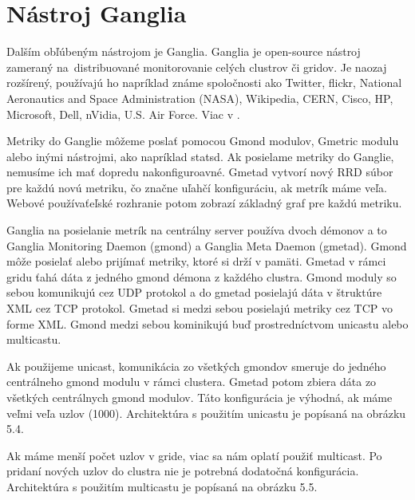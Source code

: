\documentclass[a4paper, upjsfrontpage, disablespecwarning, thesismargins, thesislinespacing]{rnthesis}
\begin{document}

\section{Nástroj Ganglia}

Dalším obľúbeným nástrojom je Ganglia.
Ganglia je open-source nástroj zameraný na~distribuované monitorovanie celých clustrov či gridov.
Je naozaj rozšírený, používajú ho napríklad známe spoločnosti ako Twitter, flickr, National Aeronautics and Space Administration (NASA), Wikipedia, CERN, Cisco, HP, Microsoft, Dell, nVidia, U.S. Air Force.
Viac v \cite{5}.

Metriky do Ganglie môžeme poslať pomocou Gmond modulov, Gmetric modulu alebo inými nástrojmi, ako napríklad statsd.
Ak posielame metriky do Ganglie, nemusíme ich mať dopredu nakonfiguroavné.
Gmetad vytvorí nový RRD súbor pre každú novú metriku, čo značne uľahčí konfiguráciu, ak metrík máme veľa.
Webové používaťeľské rozhranie potom zobrazí základný graf pre každú metriku.

Ganglia na posielanie metrík na centrálny server používa dvoch démonov a to Ganglia Monitoring Daemon (gmond) a Ganglia Meta Daemon (gmetad).
Gmond môže posielať alebo prijímať metriky, ktoré si drží v pamäti.
Gmetad v rámci gridu ťahá dáta z jedného gmond démona z každého clustra.
Gmond moduly so sebou komunikujú cez UDP protokol a do gmetad posielajú dáta v štruktúre XML cez TCP protokol.
Gmetad si medzi sebou posielajú metriky cez TCP vo forme XML.
Gmond medzi sebou kominikujú buď prostredníctvom unicastu alebo multicastu.

Ak použijeme unicast, komunikácia zo všetkých gmondov smeruje do jedného centrálneho gmond modulu v rámci clustera.
Gmetad potom zbiera dáta zo všetkých centrálnych gmond modulov.
Táto konfigurácia je výhodná, ak máme veľmi veľa uzlov (1000).
Architektúra s použitím unicastu je popísaná na obrázku 5.4.

Ak máme menší počet uzlov v gride, viac sa nám oplatí použiť multicast.
Po pridaní nových uzlov do clustra nie je potrebná dodatočná konfigurácia.
Architektúra s použitím multicastu je popísaná na obrázku 5.5.
\end{document}
